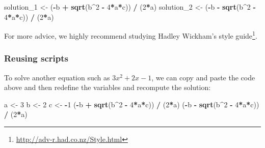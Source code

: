 \documentclass[
]{article}
\newenvironment{Shaded}{\begin{snugshade}}{\end{snugshade}}
\newcommand{\DecValTok}[1]{\textcolor[rgb]{0.00,0.00,0.81}{#1}}
\newcommand{\FunctionTok}[1]{\textcolor[rgb]{0.13,0.29,0.53}{\textbf{#1}}}
\newcommand{\NormalTok}[1]{#1}
\newcommand{\OtherTok}[1]{\textcolor[rgb]{0.56,0.35,0.01}{#1}}
\newcommand{\SpecialCharTok}[1]{\textcolor[rgb]{0.81,0.36,0.00}{\textbf{#1}}}
\begin{document}
\begin{Shaded}
\begin{Highlighting}[]
\NormalTok{solution\_1 }\OtherTok{\textless{}{-}}\NormalTok{ (}\SpecialCharTok{{-}}\NormalTok{b }\SpecialCharTok{+} \FunctionTok{sqrt}\NormalTok{(b}\SpecialCharTok{\^{}}\DecValTok{2} \SpecialCharTok{{-}} \DecValTok{4}\SpecialCharTok{*}\NormalTok{a}\SpecialCharTok{*}\NormalTok{c)) }\SpecialCharTok{/}\NormalTok{ (}\DecValTok{2}\SpecialCharTok{*}\NormalTok{a)}
\NormalTok{solution\_2 }\OtherTok{\textless{}{-}}\NormalTok{ (}\SpecialCharTok{{-}}\NormalTok{b }\SpecialCharTok{{-}} \FunctionTok{sqrt}\NormalTok{(b}\SpecialCharTok{\^{}}\DecValTok{2} \SpecialCharTok{{-}} \DecValTok{4}\SpecialCharTok{*}\NormalTok{a}\SpecialCharTok{*}\NormalTok{c)) }\SpecialCharTok{/}\NormalTok{ (}\DecValTok{2}\SpecialCharTok{*}\NormalTok{a)}
\end{Highlighting}
\end{Shaded}

For more advice, we highly recommend studying Hadley Wickham's style
guide\footnote{\url{http://adv-r.had.co.nz/Style.html}}.

\subsubsection{Reusing scripts}\label{reusing-scripts}

To solve another equation such as \(3x^2 + 2x -1\), we can copy and
paste the code above and then redefine the variables and recompute the
solution:

\begin{Shaded}
\begin{Highlighting}[]
\NormalTok{a }\OtherTok{\textless{}{-}} \DecValTok{3}
\NormalTok{b }\OtherTok{\textless{}{-}} \DecValTok{2}
\NormalTok{c }\OtherTok{\textless{}{-}} \SpecialCharTok{{-}}\DecValTok{1}
\NormalTok{(}\SpecialCharTok{{-}}\NormalTok{b }\SpecialCharTok{+} \FunctionTok{sqrt}\NormalTok{(b}\SpecialCharTok{\^{}}\DecValTok{2} \SpecialCharTok{{-}} \DecValTok{4}\SpecialCharTok{*}\NormalTok{a}\SpecialCharTok{*}\NormalTok{c)) }\SpecialCharTok{/}\NormalTok{ (}\DecValTok{2}\SpecialCharTok{*}\NormalTok{a)}
\NormalTok{(}\SpecialCharTok{{-}}\NormalTok{b }\SpecialCharTok{{-}} \FunctionTok{sqrt}\NormalTok{(b}\SpecialCharTok{\^{}}\DecValTok{2} \SpecialCharTok{{-}} \DecValTok{4}\SpecialCharTok{*}\NormalTok{a}\SpecialCharTok{*}\NormalTok{c)) }\SpecialCharTok{/}\NormalTok{ (}\DecValTok{2}\SpecialCharTok{*}\NormalTok{a)}
\end{Highlighting}
\end{Shaded}
\end{document}
